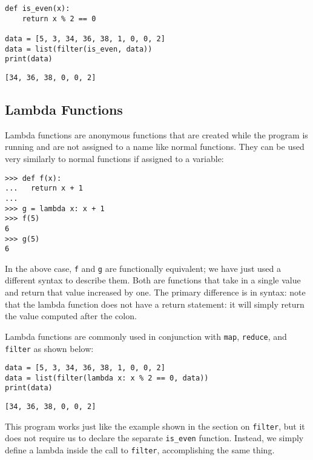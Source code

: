 \documentclass[11pt]{cselabheader}
\begin{document}
\begin{lstlisting}[style=python]
def is_even(x):
    return x % 2 == 0

data = [5, 3, 34, 36, 38, 1, 0, 0, 2]
data = list(filter(is_even, data))
print(data)
\end{lstlisting}

\begin{lstlisting}[style=bash]
[34, 36, 38, 0, 0, 2]
\end{lstlisting}

\subsection{Lambda Functions}
\label{subsec:lambda}
Lambda functions are anonymous functions that are created while the program is
running and are not assigned to a name like normal functions. They can be used
very similarly to normal functions if assigned to a variable:

\begin{lstlisting}[style=ipython]
>>> def f(x):
...   return x + 1
... 
>>> g = lambda x: x + 1
>>> f(5)
6
>>> g(5)
6
\end{lstlisting}

In the above case, \lstinline{f} and \lstinline{g} are functionally equivalent;
we have just used a different syntax to describe them. 
Both are functions that take in a single value and return that value increased
by one. The primary difference is in syntax: note that the lambda function does
not have a return statement: it will simply return the value computed after the
colon.

Lambda functions are commonly used in conjunction with \lstinline{map},
\lstinline{reduce}, and \lstinline{filter} as shown below:

\begin{lstlisting}[style=python]
data = [5, 3, 34, 36, 38, 1, 0, 0, 2]
data = list(filter(lambda x: x % 2 == 0, data))
print(data)
\end{lstlisting}

\begin{lstlisting}[style=bash]
[34, 36, 38, 0, 0, 2]
\end{lstlisting}

This program works just like the example shown in the section on
\lstinline{filter}, but it does not require us to declare the separate
\lstinline{is_even} function. Instead, we simply define a lambda inside the call
to \lstinline{filter}, accomplishing the same thing.
\end{document}

